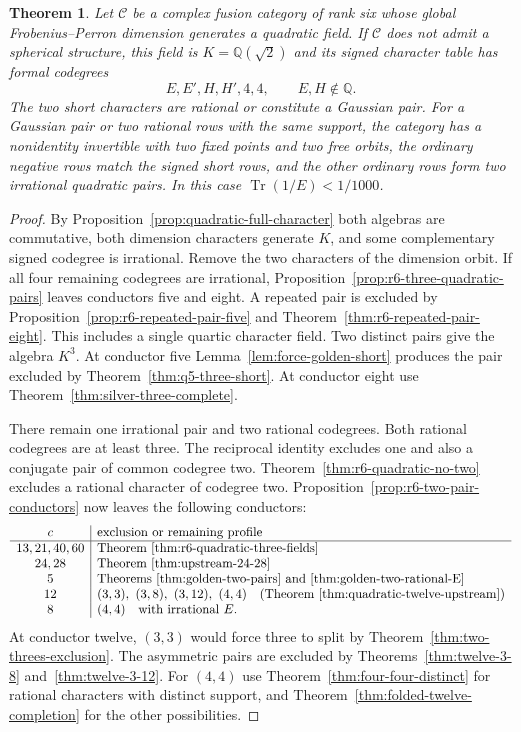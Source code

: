 \documentclass[11pt,reqno]{amsart}
\newtheorem{theorem}{Theorem}[section]
\theoremstyle{remark}\newtheorem{remark}[theorem]{Remark}
\numberwithin{equation}{section}
\begin{document}
\begin{theorem}\label{thm:full-quadratic-reduction}
Let $\mathcal C$ be a complex fusion category of rank six whose global Frobenius--Perron dimension generates a quadratic field. If $\mathcal C$ does not admit a spherical structure, this field is $K=\mathbb Q(\sqrt2)$ and its signed character table has formal codegrees
\[
 E,E',H,H',4,4,\qquad E,H\notin\mathbb Q.
\]
The two short characters are rational or constitute a Gaussian pair. For a Gaussian pair or two rational rows with the same support, the category has a nonidentity invertible with two fixed points and two free orbits, the ordinary negative rows match the signed short rows, and the other ordinary rows form two irrational quadratic pairs. In this case $\operatorname{Tr}(1/E)<1/1000$.
\end{theorem}
\begin{proof}
By Proposition~\ref{prop:quadratic-full-character} both algebras
are commutative, both dimension characters generate $K$, and some
complementary signed codegree is irrational. Remove the two characters
of the dimension orbit. If all four remaining codegrees are irrational,
Proposition~\ref{prop:r6-three-quadratic-pairs} leaves conductors five
and eight. A repeated pair is excluded by
Proposition~\ref{prop:r6-repeated-pair-five} and
Theorem~\ref{thm:r6-repeated-pair-eight}. This includes a single
quartic character field. Two distinct pairs give the algebra $K^3$.
At conductor five Lemma~\ref{lem:force-golden-short} produces the
pair excluded by Theorem~\ref{thm:q5-three-short}. At conductor eight
use Theorem~\ref{thm:silver-three-complete}.

There remain one irrational pair and two rational codegrees. Both
rational codegrees are at least three. The reciprocal identity excludes
one and also a conjugate pair of common codegree two.
Theorem~\ref{thm:r6-quadratic-no-two} excludes a rational character of
codegree two. Proposition~\ref{prop:r6-two-pair-conductors} now leaves
the following conductors:
\[
\begin{array}{c|l}
 c & \text{exclusion or remaining profile} \\ \hline
 13,21,40,60 & \text{Theorem~\ref{thm:r6-quadratic-three-fields}}\\
 24,28 & \text{Theorem~\ref{thm:upstream-24-28}}\\
 5 & \text{Theorems~\ref{thm:golden-two-pairs} and~\ref{thm:golden-two-rational-E}}\\
 12 & (3,3),\ (3,8),\ (3,12),\ (4,4)
                       \quad\text{(Theorem~\ref{thm:quadratic-twelve-upstream})}\\
 8 & (4,4)\quad\text{with irrational }E .
\end{array}
\]
At conductor twelve, $(3,3)$ would force three to split by
Theorem~\ref{thm:two-threes-exclusion}. The asymmetric pairs are
excluded by Theorems~\ref{thm:twelve-3-8} and~\ref{thm:twelve-3-12}.
For $(4,4)$ use Theorem~\ref{thm:four-four-distinct} for rational
characters with distinct support, and
Theorem~\ref{thm:folded-twelve-completion} for the other possibilities.


\end{proof}
\end{document}
